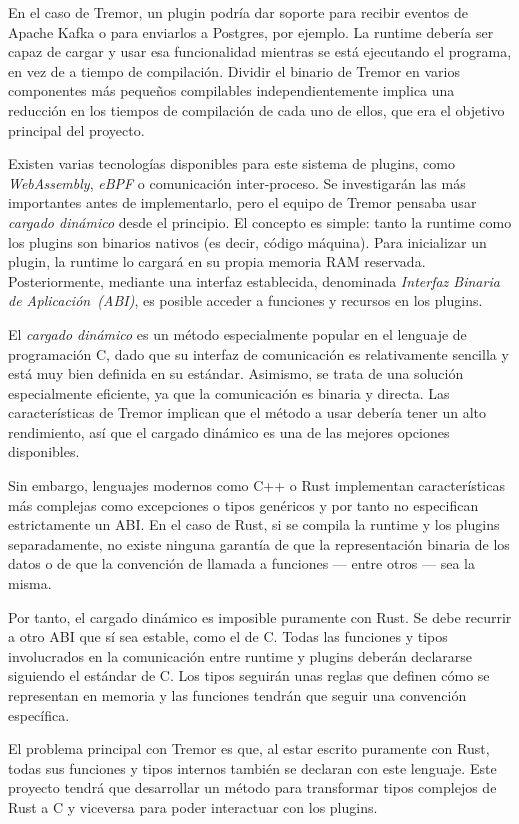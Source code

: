 En el caso de Tremor, un plugin podría dar soporte para recibir eventos de
Apache Kafka o para enviarlos a Postgres, por ejemplo. La runtime debería ser
capaz de cargar y usar esa funcionalidad mientras se está ejecutando el
programa, en vez de a tiempo de compilación. Dividir el binario de Tremor en
varios componentes más pequeños compilables independientemente implica una
reducción en los tiempos de compilación de cada uno de ellos, que era el
objetivo principal del proyecto.

Existen varias tecnologías disponibles para este sistema de plugins, como
\emph{WebAssembly}, \emph{eBPF} o comunicación inter-proceso. Se investigarán
las más importantes antes de implementarlo, pero el equipo de Tremor pensaba
usar \emph{cargado dinámico} desde el principio. El concepto es simple: tanto la
runtime como los plugins son binarios nativos (es decir, código máquina). Para
inicializar un plugin, la runtime lo cargará en su propia memoria RAM reservada.
Posteriormente, mediante una interfaz establecida, denominada \emph{Interfaz
Binaria de Aplicación~(ABI)}, es posible acceder a funciones y recursos en los
plugins.

El \emph{cargado dinámico} es un método especialmente popular en el lenguaje de
programación C, dado que su interfaz de comunicación es relativamente sencilla y
está muy bien definida en su estándar. Asimismo, se trata de una solución
especialmente eficiente, ya que la comunicación es binaria y directa. Las
características de Tremor implican que el método a usar debería tener un alto
rendimiento, así que el cargado dinámico es una de las mejores opciones
disponibles.

Sin embargo, lenguajes modernos como C++ o Rust implementan características más
complejas como excepciones o tipos genéricos y por tanto no especifican
estrictamente un ABI. En el caso de Rust, si se compila la runtime y los plugins
separadamente, no existe ninguna garantía de que la representación binaria de
los datos o de que la convención de llamada a funciones --- entre otros --- sea
la misma.

Por tanto, el cargado dinámico es imposible puramente con Rust. Se debe recurrir
a otro ABI que sí sea estable, como el de C. Todas las funciones y tipos
involucrados en la comunicación entre runtime y plugins deberán declararse
siguiendo el estándar de C. Los tipos seguirán unas reglas que definen cómo se
representan en memoria y las funciones tendrán que seguir una convención
específica.

El problema principal con Tremor es que, al estar escrito puramente con Rust,
todas sus funciones y tipos internos también se declaran con este lenguaje. Este
proyecto tendrá que desarrollar un método para transformar tipos complejos de
Rust a C y viceversa para poder interactuar con los plugins.

